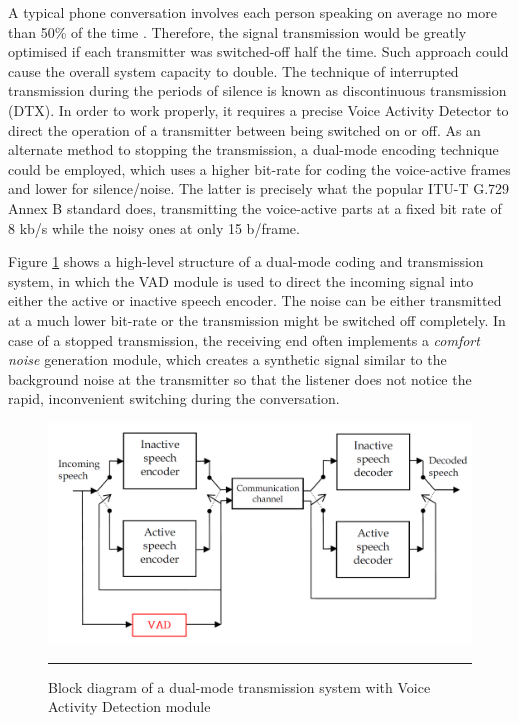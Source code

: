 A typical phone conversation involves each person speaking on average no more than 50\% of the time \citep{GSMControl}. Therefore, the signal transmission would be greatly optimised if each transmitter was switched-off half the time. Such approach could cause the overall system capacity to double. The technique of interrupted transmission during the periods of silence is known as discontinuous transmission (DTX). In order to work properly, it requires a precise Voice Activity Detector to direct the operation of a transmitter between being switched on or off. As an alternate method to stopping the transmission, a dual-mode encoding technique could be employed, which uses a higher bit-rate for coding the voice-active frames and lower for silence/noise. The latter is precisely what the popular ITU-T G.729 Annex B \cite{G729} standard does, transmitting the voice-active parts at a fixed bit rate of 8 kb/s while the noisy ones at only 15 b/frame.

Figure \ref{fig:DTXVAD} shows a high-level structure of a dual-mode coding and transmission system, in which the VAD module is used to direct the incoming signal into either the active or inactive speech encoder. The noise can be either transmitted at a much lower bit-rate or the transmission might be switched off completely. In case of a stopped transmission, the receiving end often implements a \emph{comfort noise} \citep{GSMControl, G729, RamirezGorriz} generation module, which creates a synthetic signal similar to the background noise at the transmitter so that the listener does not notice the rapid, inconvenient switching during the conversation.

\begin{figure}[htbp]
	\centering
		\includegraphics[width=1\columnwidth]{Figures/Chapter1/DTXVAD.png}
		\rule{37em}{0.5pt}
	\caption[Block diagram of a dual-mode transmission system with Voice Activity Detection module]{Block diagram of a dual-mode transmission system with Voice Activity Detection module \cite{G729}}
	\label{fig:DTXVAD}
\end{figure}

